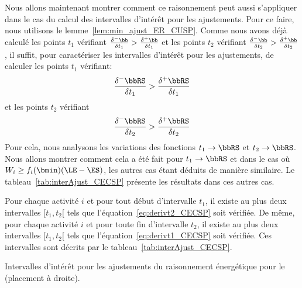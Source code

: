 Nous allons maintenant montrer comment ce raisonnement peut aussi
s'appliquer dans le cas du calcul des intervalles d'intérêt pour les
ajustements. Pour ce faire, nous utilisons le
lemme~\ref{lem:min_ajust_ER_CUSP}. Comme nous avons déjà calculé les
points $t_1$ vérifiant $\frac{\delta^{-}\bb}{\delta
t_1}>\frac{\delta^{+}\bb}{\delta t_1}$ et les points $t_2$ vérifiant
$\frac{\delta^{-}\bb}{\delta t_2} >\frac{\delta^{+}\bb}{\delta
t_2}$, il suffit, pour caractériser les intervalles d'intérêt pour les
ajustements, de calculer les points $t_1$ vérifiant:
\begin{equation}
\frac{\delta^{-}\bbRS}{\delta t_1} >\frac{\delta^{+}\bbRS}{\delta
t_1}\label{eq:derivt1_CECSP} \end{equation}
et les points $t_2$ vérifiant \begin{equation}
\frac{\delta^{-}\bbRS}{\delta t_2} > \frac{\delta^{+}\bbRS}{\delta
t_2}\label{eq:derivt2_CECSP}\end{equation}
Pour cela, nous analysons les variations des fonctions $t_1
\rightarrow \bbRS$ et $t_2 \rightarrow \bbRS$. Nous allons montrer
comment cela a été fait pour $t_1 \rightarrow \bbRS$ et dans le cas où
$W_i \ge f_i(\bmin) (\LE - \ES)$, les autres cas étant déduits de
manière similaire. Le tableau~\ref{tab:interAjust_CECSP} présente 
les résultats dans ces autres cas. 


\begin{theo}
  Pour chaque activité $i$ et pour tout début d'intervalle $t_1$, il
  existe au plus deux intervalles $[t_1,t_2[$ tels que
  l'équation~\eqref{eq:derivt2_CECSP} soit vérifiée.
  De même,  pour chaque activité $i$ et pour toute fin d'intervalle $t_2$, il
  existe au plus deux intervalles $[t_1,t_2[$ tels que
  l'équation~\eqref{eq:derivt1_CECSP} soit vérifiée. 
  Ces intervalles sont décrits
  par le tableau~\ref{tab:interAjust_CECSP}.
  \begin{table}[!htb]
  
  \caption{Intervalles d'intérêt pour les ajustements du
    raisonnement énergétique pour le \CECSP (placement à droite).}
  \label{tab:interAjust_CECSP}
\end{table}
\end{theo}

